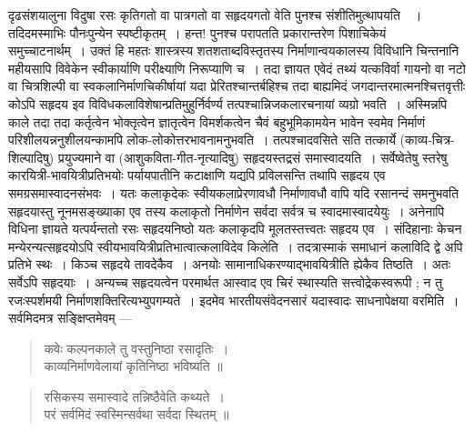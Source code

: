 {\dev दृढसंशयालुना विदुषा रसः कृतिगतो वा पात्रगतो वा सहृदयगतो वेति पुनश्च संशीतिमुत्थाप\-यति}~{\dev~। तदिदमस्माभिः पौनःपुन्येन स्पष्टीकृतम्~। हन्त! पुनश्च परापतति प्रकारान्तरेण पिशाचिकेयं समुच्चाटनार्थम्~। उक्तं हि महतः शास्त्रस्य शतशताब्दविस्तृतस्य निर्माणान्वय\-कालस्य विविधानि चिन्तनानि महीयसापि विवेकेन स्वीकार्याणि परीक्ष्याणि निरू\-प्याणि च~। तदा ज्ञायत एवेदं तथ्यं यत्कविर्वा गायनो वा नटो वा चित्रशिल्पी वा स्वकलानिर्माण\-चिकीर्षायां यदा प्रेरितश्चान्तर्बहिश्च तदा बाह्यमिदं जगदान्तरमात्मनश्चित्तवृत्तीः कोऽपि सहृदय इव विविधकलाविशेषान्प्रतिमुहुर्निर्वर्ण्य तत्पश्चान्निजकलारचनायां व्यग्रो भवति~। अस्मिन्नपि काले तदा तदा कर्तृत्वेन भोक्तृत्वेन ज्ञातृत्वेन विमर्शकत्वेन चैवं बहुभूमिकामयेन भावेन स्वमेव निर्माणं परिशीलयन्ननुशीलयन्कामपि लोक-लोकोत्तरभावनामनुभवति~। तत्पश्चादवसिते सति तत्कार्ये (काव्य-चित्र-शिल्पादिषु) प्रयुज्यमाने वा (आशुकविता-गीत-नृत्यादिषु) सहृदयस्तद्रसं समास्वादयति~। सर्वेष्वेतेषु स्तरेषु कारयित्री-भावयित्रीप्रतिभयोः पर्यायपातीनि कटाक्षाणि यद्यपि प्रविलसन्ति तथापि सहृदय एव समग्रसमास्वादनसंभवः~। यतः कलाकृदेकः स्वीय\-कलाप्रेरणावधौ निर्माणावधौ वापि यदि रसानन्दं समनुभवति सहृदयास्तु नूनमसङ्ख्याका एव तस्य कलाकृतो निर्माणेन सर्वदा सर्वत्र च स्वादमास्वादयेयुः~। अनेनापि विधिना ज्ञायते यत्पर्यन्ततो रसः सहृदयनिष्ठो यतः कलाकृदपि मूलतस्तत्त्वतः सहृदय एव~। संदिहानाः केचन मन्येरन्यत्सहृदयोऽपि स्वीयभावयित्रीप्रतिभात्वात्कलाविदेव किलेति~। तदत्रास्माकं समाधानं कलाविदि द्वे अपि प्रतिभे स्थः~। किञ्च सहृदये तावदेकैव~। अनयोः सामानाधिकरण्याद्भावयि\-त्रीति ह्येकैव तिष्ठति~। अतः सर्वेऽपि सहृदयाः~। अन्यच्च सहृदयत्वेन परमार्थत आस्वाद एव चिरं स्थास्यति सत्त्वोद्रेकस्वरूपी ; न तु रजःस्पर्शमयी निर्माणशक्तिरित्यभ्युपगम्यते~। इदमेव भारतीयसंवेदनसारं यदास्वादः साधनापेक्षया वरमिति~। सर्वमिदमत्र सङ्क्षिप्तमेवम् --- }   
\begin{quote}
{\dev कवेः कल्पनकाले तु वस्तुनिष्ठा रसादृतिः~।}\\
{\dev काव्यनिर्माणवेलायां कृतिनिष्ठा भविष्यति ॥}
\end{quote}
\begin{quote}
{\dev रसिकस्य समास्वादे तन्निष्ठैवेति कथ्यते~।}\\
{\dev परं सर्वमिदं स्वस्मिन्सर्वथा सर्वदा स्थितम् ॥}
\end{quote}

